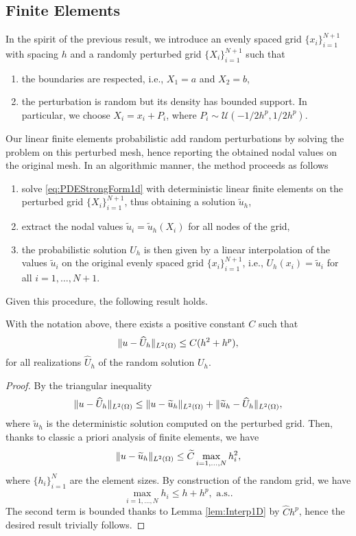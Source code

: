 \documentclass[10pt]{article}
\begin{document}
\subsection{Finite Elements} In the spirit of the previous result, we introduce an evenly spaced grid $\{x_i\}_{i=1}^{N+1}$ with spacing $h$ and a randomly perturbed grid $\{X_i\}_{i=1}^{N+1}$ such that
\begin{enumerate}
	\item the boundaries are respected, i.e., $X_1 = a$ and $X_2 = b$,
	\item the perturbation is random but its density has bounded support. In particular, we choose $X_i = x_i + P_i$, where $P_i \sim \mathcal{U} (-1/2 h^{p}, 1/2 h^p)$.
\end{enumerate}
Our linear finite elements probabilistic add random perturbations by solving the problem on this perturbed mesh, hence reporting the obtained nodal values on the original mesh. In an algorithmic manner, the method proceeds as follows
\begin{enumerate}
	\item solve \eqref{eq:PDEStrongForm1d} with deterministic linear finite elements on the perturbed grid $\{X_i\}_{i=1}^{N+1}$, thus obtaining a solution $\tilde u_h$,
	\item extract the nodal values $\tilde u_i = \tilde u_h(X_i)$ for all nodes of the grid,
	\item the probabilistic solution $U_h$ is then given by a linear interpolation of the values $\tilde u_i$ on the original evenly spaced grid $\{x_i\}_{i=1}^{N+1}$, i.e., $U_h(x_i) = \tilde u_i$ for all $i = 1, \ldots, N+1$.
\end{enumerate} 
Given this procedure, the following result holds.
\begin{theorem}\label{thm:Convergence} With the notation above, there exists a positive constant $C$ such that 
	\begin{equation}
		\lVert u - \widehat U_h\rVert_{L^2(\Omega)} \leq C(h^2 + h^p),
	\end{equation}
	for all realizations $\hat U_h$ of the random solution $U_h$.
\end{theorem}
\begin{proof} By the triangular inequality 
	\begin{equation}
		\lVert u - \widehat U_h\rVert_{L^2(\Omega)} \leq \lVert u - \widetilde u_h\rVert_{L^2(\Omega)} + \lVert\widetilde u_h - \widehat U_h\rVert_{L^2(\Omega)},
	\end{equation}
	where $\tilde u_h$ is the deterministic solution computed on the perturbed grid. Then, thanks to classic a priori analysis of finite elements, we have
	\begin{equation}
		\lVert u - \widetilde u_h\rVert_{L^2(\Omega)} \leq \widetilde C \max_{i=1,\ldots, N} h_i^2,
	\end{equation}
	where $\{h_i\}_{i=1}^{N}$ are the element sizes. By construction of the random grid, we have
	\begin{equation}
		\max_{i=1,\ldots, N} h_i \leq h + h^p, \text{ a.s.}.
	\end{equation}
	The second term is bounded thanks to Lemma \ref{lem:Interp1D} by $\hat C h^p$, hence the desired result trivially follows.
\end{proof}
\end{document}
